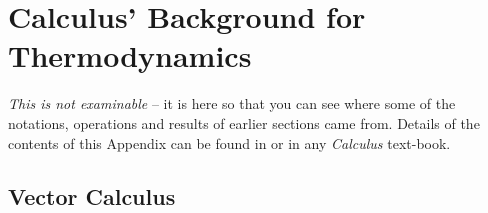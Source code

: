 
\chapter{Calculus' Background for Thermodynamics}\label{Appendix_Calculus}
{\it This is not examinable} -- it is here so that you can see where some of the notations, operations and results of earlier sections came from. Details of the contents of this Appendix can be found in \cite{Leithold_Book,Kallo_1955,Strang_Book} or in any {\it Calculus} text-book.
\bigskip


\localtableofcontents

\section{Vector Calculus}

